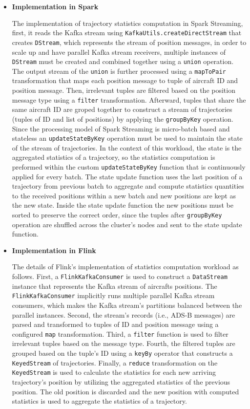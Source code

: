 \documentclass[]{article}
\begin{document}
\begin{itemize}
\item {\bf{Implementation in Spark }}

\par The implementation of trajectory statistics computation in Spark Streaming, first, it reads the Kafka stream using \texttt{KafkaUtils.createDirectStream} that creates \texttt{DStream}, which represents the stream of position messages, in order to scale up and have parallel Kafka stream receivers, multiple instances of \texttt{DStream} must be created and combined together using a \texttt{union} operation. The output stream of the \texttt{union} is further processed using a \texttt{mapToPair} transformation that  maps each position message to tuple of aircraft ID and position message. Then,  irrelevant tuples are filtered based on the position message type using  a \texttt{filter} transformation. Afterward, tuples that share the same aircraft ID are groped together to construct a stream of trajectories (tuples of ID and list of positions) by applying the \texttt{groupByKey} operation. Since the processing  model of Spark Streaming is micro-batch based and stateless an \texttt{updateStateByKey} operation must be used to maintain the state of the stream of trajectories. In the context of this workload, the state is the aggregated statistics of a trajectory, so the statistics computation is preformed within the custom \texttt{updateStateByKey} function that is continuously applied for every batch.
 The state update function uses the last position of a trajectory from previous batch to aggregate and compute statistics quantities to the received positions within a new batch and new positions are kept as the new state. Inside the state update function  the new positions must be sorted to preserve the correct order, since the tuples after \texttt{groupByKey} operation are shuffled across the cluster's  nodes and sent to the state update function.

\item {\bf{Implementation in Flink }}


The details of Flink's implementation of statistics computation workload as follows. First, a \texttt{FlinkKafkaConsumer} is used to  construct a \texttt{DataStream} instance that represents the Kafka stream of aircrafts positions. The  \texttt{FlinkKafkaConsumer} implicitly runs multiple parallel Kafka stream consumers, which makes the Kafka stream's partitions balanced between the parallel instances. Second, the stream's records (i.e., ADS-B messages) are parsed and transformed to tuples of ID and position message using a configured \texttt{map} transformation. Third, a \texttt{filter} function is used to filter irrelevant tuples based on the message type. Fourth, the filtered tuples  are grouped based on the tuple's ID using a \texttt{keyBy} operator that constructs a \texttt{KeyedStream} of trajectories. Finally, 
a \texttt{reduce} transformation on the  \texttt{KeyedStream} is used to calculate the statistics for each new arriving trajectory's position by utilizing the aggregated statistics of the previous position. The old position is discarded and the new position with computed statistics is used to aggregate the statistics of a trajectory.


\end{itemize}
\end{document}
